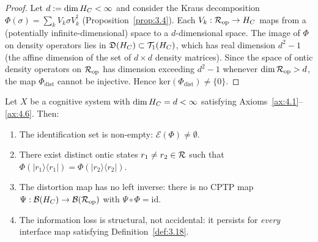 \begin{proof}
Let $d := \dim H_C < \infty$ and consider the Kraus decomposition
$\Phi(\sigma) = \sum_k V_k \sigma V_k^\dagger$
(Proposition~\ref{prop:3.4}).  Each $V_k : \mathcal{R}_{\mathrm{op}} \to H_C$
maps from a (potentially infinite-dimensional) space to a
$d$-dimensional space.  The image of $\Phi$ on density operators lies
in $\mathfrak{D}(H_C) \subset \mathcal{T}_1(H_C)$, which has real
dimension $d^2 - 1$ (the affine dimension of the set of $d \times d$
density matrices).  Since the space of ontic density operators on
$\mathcal{R}_{\mathrm{op}}$ has dimension exceeding $d^2 - 1$ whenever
$\dim\mathcal{R}_{\mathrm{op}} > d$, the map $\Phi_{\mathrm{dist}}$ cannot be
injective.  Hence $\mathrm{ker}(\Phi_{\mathrm{dist}}) \neq \{0\}$.
\end{proof}

\begin{theorem}
\label{thm:8.5}
Let $X$ be a cognitive system with
$\dim H_C = d < \infty$ satisfying
Axioms~\textup{\ref{ax:4.1}}--\textup{\ref{ax:4.6}}.  Then:
\begin{enumerate}
  \item[\textup{(i)}] The identification set is non-empty:
    $\mathcal{E}(\Phi) \neq \emptyset$.
  \item[\textup{(ii)}] There exist distinct ontic states
    $r_1 \neq r_2 \in \mathcal{R}$ such that
    $\Phi(|r_1\rangle\langle r_1|) = \Phi(|r_2\rangle\langle r_2|)$.
  \item[\textup{(iii)}] The distortion map has no left inverse: there
    is no CPTP map
    $\Psi : \mathcal{B}(H_C) \to \mathcal{B}(\mathcal{R}_{\mathrm{op}})$ with
    $\Psi \circ \Phi = \mathrm{id}$.
  \item[\textup{(iv)}] The information loss is structural, not
    accidental: it persists for \emph{every} interface map satisfying
    Definition~\textup{\ref{def:3.18}}.
\end{enumerate}
\end{theorem}

